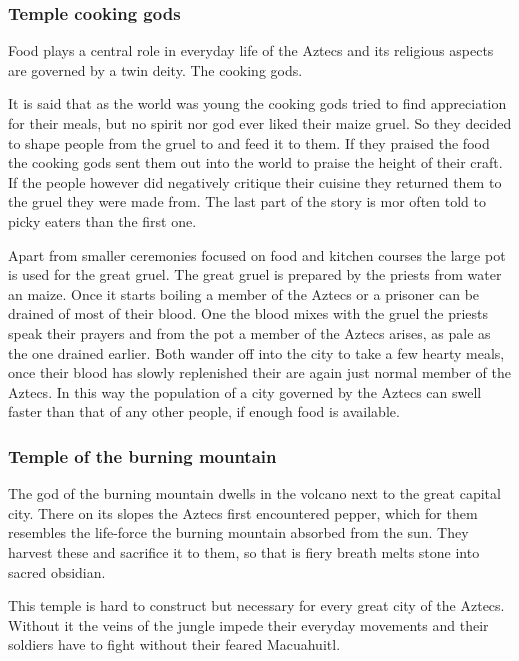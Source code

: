 \documentclass[a4paper]{book}
\begin{document}
		\subsubsection{Temple cooking gods}
			Food plays a central role in everyday life of the \gls{Aztecs}
			and its religious aspects are governed by a twin deity.
			The cooking gods.

			It is said that as the world was young the cooking gods tried to find
			appreciation for their meals, but no spirit nor god ever liked their maize gruel.
			So they decided to shape people from the gruel to and feed it to them.
			If they praised the food the cooking gods sent them out into the world to
			praise the height of their craft.
			If the people however did negatively critique their cuisine they returned them
			to the gruel they were made from.
			The last part of the story is mor often told to picky eaters than the first one.

			Apart from smaller ceremonies focused on food and kitchen courses the large pot is used
			for the great gruel.
			The great gruel is prepared by the priests from water an maize.
			Once it starts boiling a member of the \gls{Aztecs} or a prisoner can be drained of most of their blood.
			One the blood mixes with the gruel the priests speak their prayers and from the pot
			a member of the \gls{Aztecs} arises, as pale as the one drained earlier.
			Both wander off into the city to take a few hearty meals,
			once their blood has slowly replenished their are again just normal member of the \gls{Aztecs}.
			In this way the population of a city governed by the \gls{Aztecs} 
			can swell faster than that of any other people, if enough food is available.

		\subsubsection{Temple of the burning mountain}
			The god of the burning mountain dwells in the volcano next to the great capital city.
			There on its slopes the \gls{Aztecs} first encountered pepper,
			which for them resembles the life-force the burning mountain absorbed from the sun.
			They harvest these and sacrifice it to them,
			so that is fiery breath melts stone into sacred obsidian.

			This temple is hard to construct but necessary for every great city of the \gls{Aztecs}.
			Without it the veins of the jungle impede their everyday movements
			and their soldiers have to fight without their feared Macuahuitl.
\end{document}

